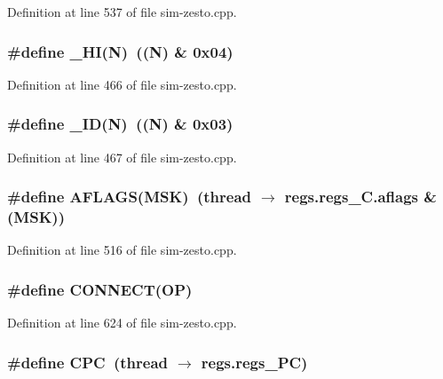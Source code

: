 Definition at line 537 of file sim-zesto.cpp.
\subsubsection[{\_\-HI}]{\setlength{\rightskip}{0pt plus 5cm}\#define \_\-HI(N)~((N) \& 0x04)}\label{sim-zesto_8cpp_950ef2d9ae345ed861765730157d37d2}




Definition at line 466 of file sim-zesto.cpp.
\subsubsection[{\_\-ID}]{\setlength{\rightskip}{0pt plus 5cm}\#define \_\-ID(N)~((N) \& 0x03)}\label{sim-zesto_8cpp_711eed827b7f6cfec827e05579cd2b66}




Definition at line 467 of file sim-zesto.cpp.
\subsubsection[{AFLAGS}]{\setlength{\rightskip}{0pt plus 5cm}\#define AFLAGS(MSK)~(thread $\rightarrow$ regs.regs\_\-C.aflags \& (MSK))}\label{sim-zesto_8cpp_369389eba049ae8bd5b4de5d660b861f}




Definition at line 516 of file sim-zesto.cpp.
\subsubsection[{CONNECT}]{\setlength{\rightskip}{0pt plus 5cm}\#define CONNECT(OP)}\label{sim-zesto_8cpp_39a7648865000d8fa2ae64257cb18132}




Definition at line 624 of file sim-zesto.cpp.
\subsubsection[{CPC}]{\setlength{\rightskip}{0pt plus 5cm}\#define CPC~(thread $\rightarrow$ regs.regs\_\-PC)}\label{sim-zesto_8cpp_47928f393a8ffdecfa07271f22beb34b}




